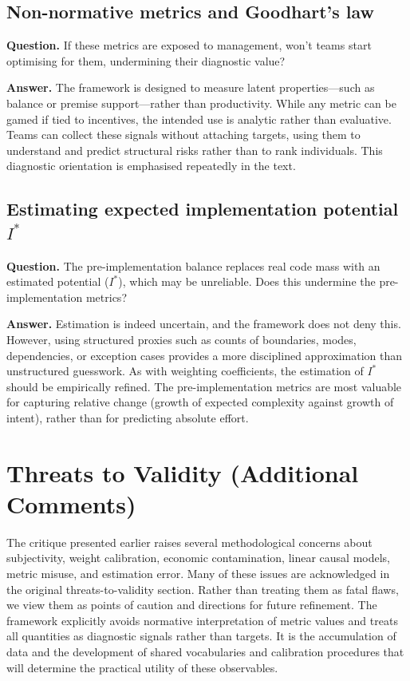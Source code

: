 \documentclass[twocolumn]{aastex701}
\begin{document}
\subsection{Non-normative metrics and Goodhart's law}
\textbf{Question.}  If these metrics are exposed to management, won't
teams start optimising for them, undermining their diagnostic value?

\textbf{Answer.}  The framework is designed to measure latent
properties—such as balance or premise support—rather than productivity.
While any metric can be gamed if tied to incentives, the intended use is
analytic rather than evaluative.  Teams can collect these signals
without attaching targets, using them to understand and predict
structural risks rather than to rank individuals.  This diagnostic
orientation is emphasised repeatedly in the text.

\subsection{Estimating expected implementation potential $I^\ast$}
\textbf{Question.}  The pre-implementation balance replaces real code
mass with an estimated potential ($I^\ast$), which may be unreliable.
Does this undermine the pre-implementation metrics?

\textbf{Answer.}  Estimation is indeed uncertain, and the framework does
not deny this.  However, using structured proxies such as counts of
boundaries, modes, dependencies, or exception cases provides a more
disciplined approximation than unstructured guesswork.
As with weighting coefficients, the estimation of $I^\ast$ should be
empirically refined.  The pre-implementation metrics are most valuable
for capturing relative change (growth of expected complexity against
growth of intent), rather than for predicting absolute effort.

\section{Threats to Validity (Additional Comments)}

The critique presented earlier raises several methodological concerns
about subjectivity, weight calibration, economic contamination,
linear causal models, metric misuse, and estimation error.  Many of
these issues are acknowledged in the original threats-to-validity
section.  Rather than treating them as fatal flaws, we view them as
points of caution and directions for future refinement.  The framework
explicitly avoids normative interpretation of metric values and treats
all quantities as diagnostic signals rather than targets.  It is the
accumulation of data and the development of shared vocabularies and
calibration procedures that will determine the practical utility of
these observables.
\end{document}
